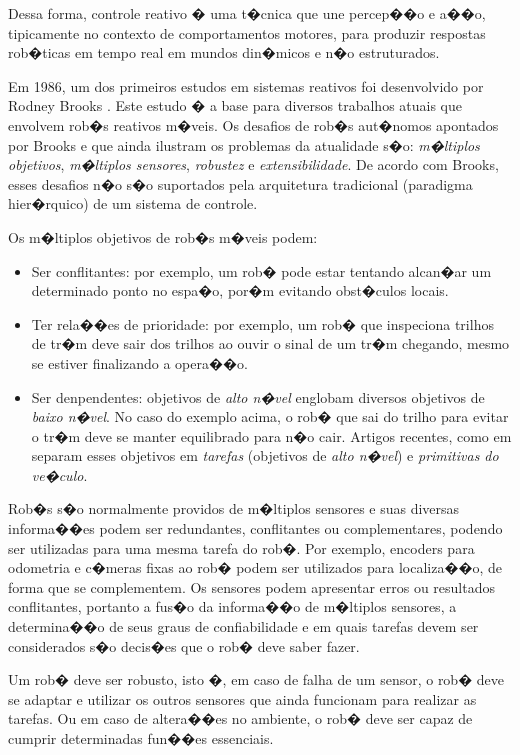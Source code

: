 Dessa forma, controle reativo � uma t�cnica que une percep��o e a��o,
tipicamente no contexto de comportamentos motores, para produzir respostas
rob�ticas em tempo real em mundos din�micos e n�o estruturados.

Em 1986, um dos primeiros estudos em sistemas reativos foi desenvolvido por
Rodney Brooks \cite{brooks1986robust}. Este estudo � a base para diversos
trabalhos atuais que envolvem rob�s reativos m�veis. Os desafios de
rob�s aut�nomos apontados por Brooks e que ainda ilustram os problemas da
atualidade s�o: \emph{m�ltiplos objetivos}, \emph{m�ltiplos sensores},
\emph{robustez} e \emph{extensibilidade}. De acordo com Brooks, esses desafios
n�o s�o suportados pela arquitetura tradicional (paradigma hier�rquico) de um
sistema de controle.

Os m�ltiplos objetivos de rob�s m�veis podem:
\begin{itemize}
  \item Ser conflitantes: por exemplo, um rob� pode estar tentando alcan�ar um
  determinado ponto no espa�o, por�m evitando obst�culos locais.
  \item Ter rela��es de prioridade: por exemplo, um rob� que inspeciona trilhos
  de tr�m deve sair dos trilhos ao ouvir o sinal de um tr�m chegando, mesmo se estiver
  finalizando a opera��o.
  \item Ser denpendentes: objetivos de \emph{alto n�vel} englobam diversos
  objetivos de \emph{baixo n�vel}. No caso do exemplo acima, o rob� que sai do
  trilho para evitar o tr�m deve se manter equilibrado para n�o cair. Artigos
  recentes, como em \cite{fryxell1996navigation} separam esses objetivos em
  \emph{tarefas} (objetivos de \emph{alto n�vel}) e \emph{primitivas do ve�culo}.
\end{itemize}

Rob�s s�o normalmente providos de m�ltiplos sensores e suas diversas
informa��es podem ser redundantes, conflitantes ou complementares,
podendo ser utilizadas para uma mesma tarefa do rob�.
Por exemplo, encoders para odometria e c�meras fixas ao rob�
podem ser utilizados para localiza��o, de forma que se complementem.
Os sensores podem apresentar erros ou resultados conflitantes, portanto a fus�o
da informa��o de m�ltiplos sensores, a determina��o de seus graus de
confiabilidade e em quais tarefas devem ser considerados s�o decis�es que o
rob� deve saber fazer.

Um rob� deve ser robusto, isto �, em caso de falha de um sensor, o rob�
deve se adaptar e utilizar os outros sensores que ainda funcionam para realizar as
tarefas. Ou em caso de altera��es no ambiente, o rob� deve ser
capaz de cumprir determinadas fun��es essenciais.

